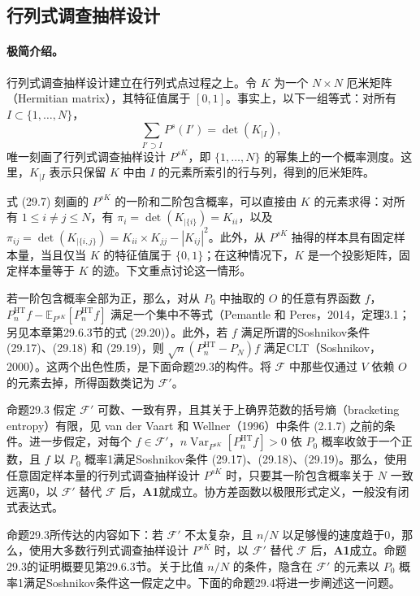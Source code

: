 \subsection{行列式调查抽样设计}

\paragraph{极简介绍。}
行列式调查抽样设计建立在行列式点过程之上。令 $K$ 为一个 $N\times N$ 厄米矩阵（Hermitian matrix），其特征值属于 $[0,1]$。事实上，以下一组等式：对所有 $I\subset\{1,\ldots,N\}$，
\begin{equation}
\sum_{I'\supset I}P^s(I')=\det(K_{|I}),
\tag{29.7}
\end{equation}
唯一刻画了行列式调查抽样设计 $P^{sK}$，即 $\{1,\ldots,N\}$ 的幂集上的一个概率测度。这里，$K_{|I}$ 表示只保留 $K$ 中由 $I$ 的元素所索引的行与列，得到的厄米矩阵。

式 (29.7) 刻画的 $P^{sK}$ 的一阶和二阶包含概率，可以直接由 $K$ 的元素求得：对所有 $1\le i\ne j\le N$，有 $\pi_i=\det(K_{|\{i\}})=K_{ii}$，以及 $\pi_{ij}=\det(K_{|\{i,j\}})=K_{ii}\times K_{jj}-|K_{ij}|^2$。此外，从 $P^{sK}$ 抽得的样本具有固定样本量，当且仅当 $K$ 的特征值属于 $\{0,1\}$；在这种情况下，$K$ 是一个投影矩阵，固定样本量等于 $K$ 的迹。下文重点讨论这一情形。

若一阶包含概率全部为正，那么，对从 $P_0$ 中抽取的 $O$ 的任意有界函数 $f$，$P_n^{\mathrm{HT}}f-\mathbb E_{P^{sK}}[P_n^{\mathrm{HT}}f]$ 满足一个集中不等式（Pemantle 和 Peres，2014，定理3.1；另见本章第29.6.3节的式 (29.20)）。此外，若 $f$ 满足所谓的Soshnikov条件 (29.17)、(29.18) 和 (29.19)，则 $\sqrt n(P_n^{\mathrm{HT}}-P_N)f$ 满足CLT（Soshnikov，2000）。这两个出色性质，是下面命题29.3的构件。将 $\mathcal F$ 中那些仅通过 $V$ 依赖 $O$ 的元素去掉，所得函数类记为 $\mathcal F'$。

\begin{bookresult}{命题}{29.3}
假定 $\mathcal F'$ 可数、一致有界，且其关于上确界范数的括号熵（bracketing entropy）有限，见 van der Vaart 和 Wellner（1996）中条件 (2.1.7) 之前的条件。进一步假定，对每个 $f\in\mathcal F'$，$n\operatorname{Var}_{P^{sK}}[P_n^{\mathrm{HT}}f]>0$ 依 $P_0$ 概率收敛于一个正数，且 $f$ 以 $P_0$ 概率1满足Soshnikov条件 (29.17)、(29.18)、(29.19)。那么，使用任意固定样本量的行列式调查抽样设计 $P^{sK}$ 时，只要其一阶包含概率关于 $N$ 一致远离0，以 $\mathcal F'$ 替代 $\mathcal F$ 后，\textbf{A1}就成立。协方差函数以极限形式定义，一般没有闭式表达式。
\end{bookresult}

命题29.3所传达的内容如下：若 $\mathcal F'$ 不太复杂，且 $n/N$ 以足够慢的速度趋于0，那么，使用大多数行列式调查抽样设计 $P^{sK}$ 时，以 $\mathcal F'$ 替代 $\mathcal F$ 后，\textbf{A1}成立。命题29.3的证明概要见第29.6.3节。关于比值 $n/N$ 的条件，隐含在 $\mathcal F'$ 的元素以 $P_0$ 概率1满足Soshnikov条件这一假定之中。下面的命题29.4将进一步阐述这一问题。

